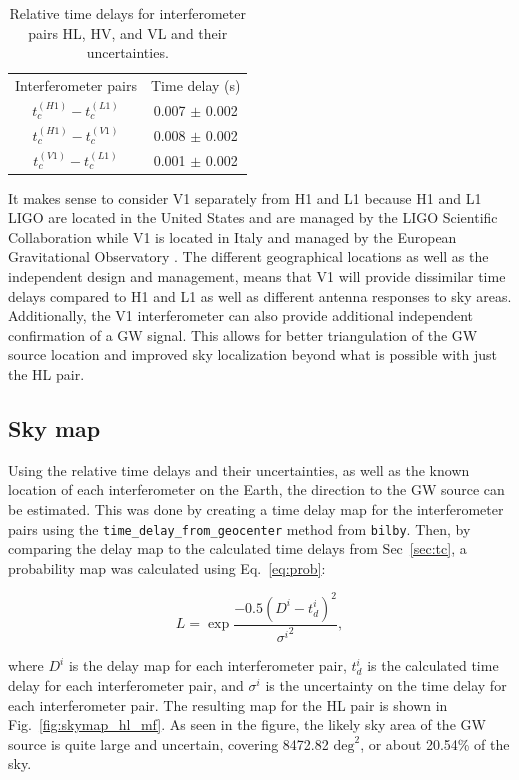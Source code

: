 \documentclass[11pt,a4paper]{article}
\begin{document}
\begin{table}[h]
    \centering
    \begin{tabular}{cc}
    Interferometer pairs & Time delay (s) \\
    $t_c^{(H1)} - t_c^{(L1)}$ & 0.007 $\pm$ 0.002 \\
    $t_c^{(H1)} - t_c^{(V1)}$ & 0.008 $\pm$ 0.002 \\
    $t_c^{(V1)} - t_c^{(L1)}$ & 0.001 $\pm$ 0.002 \\
    \end{tabular}
    \caption{Relative time delays for interferometer pairs HL, HV, and VL and their uncertainties.}
    \label{tab:tds}
\end{table}

It makes sense to consider V1 separately from H1 and L1 because H1 and L1 LIGO are located in the United States and are managed by the LIGO Scientific Collaboration while V1 is located in Italy and managed by the European Gravitational Observatory \citep{LIGO2015, Acernese_2014}. The different geographical locations as well as the independent design and management, means that V1 will provide dissimilar time delays compared to H1 and L1 as well as different antenna responses to sky areas. Additionally, the V1 interferometer can also provide additional independent confirmation of a GW signal. This allows for better triangulation of the GW source location and improved sky localization beyond what is possible with just the HL pair.
\clearpage
\subsection{Sky map}
\label{sec:skymap_mf}
Using the relative time delays and their uncertainties, as well as the known location of each interferometer on the Earth, the direction to the GW source can be estimated. This was done by creating a time delay map for the interferometer pairs using the \texttt{time\_delay\_from\_geocenter} method from \texttt{bilby}. Then, by comparing the delay map to the calculated time delays from Sec~\ref{sec:tc}, a probability map was calculated using Eq.~\ref{eq:prob}:

\begin{equation}
    L = \exp{\frac{-0.5(D^i-t_d^i)^2}{{\sigma^i}^2}},
    \label{eq:prob}
\end{equation}

where $D^i$ is the delay map for each interferometer pair, $t_d^i$ is the calculated time delay for each interferometer pair, and $\sigma^i$ is the uncertainty on the time delay for each interferometer pair. The resulting map for the HL pair is shown in Fig.~\ref{fig:skymap_hl_mf}. As seen in the figure, the likely sky area of the GW source is quite large and uncertain, covering 8472.82 $\mathrm{deg}^2$, or about 20.54\% of the sky. 
\end{document}
